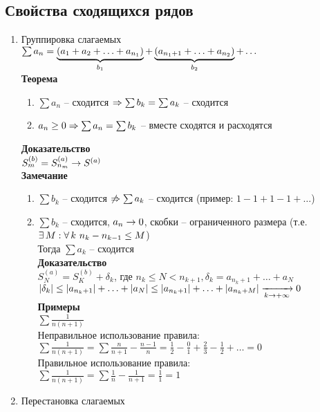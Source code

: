 \documentclass[12pt]{article}
\begin{document}
\subsection{Свойства сходящихся рядов}
\begin{enumerate}
    \item Группировка слагаемых\\
    $\sum a_n = \ub{b_1}{(a_1 + a_2 + \ldots + a_{n_1})} + \ub{b_2}{(a_{n_1+1} + \ldots + a_{n_2})} + \ldots$\\
    \textbf{Теорема}
    \begin{enumerate}
        \item $\sum a_n$ -- сходится $\Rto \sum b_k = \sum a_k$ -- сходится
        \item $a_n \geq 0 \Rto \sum a_n = \sum b_k$ -- вместе сходятся и расходятся
    \end{enumerate}
    \textbf{Доказательство}\\
    $S^{(b)}_m = S^{(a)}_{n_m} \rto S^{(a)}$\\
    \textbf{Замечание}
    \begin{enumerate}
        \item $\sum b_k$ -- сходится $\not\Rto \sum a_k$ -- сходится (пример: $1 - 1 + 1 - 1 + \ldots$)
        \item $\sum b_k$ -- сходится, $a_n \rto 0$, скобки -- ограниченного размера (т.е. $\ex M: \fall k\ n_k - n_{k-1} \leq M$)\\
        Тогда $\sum a_k$ -- сходится\\
        \textbf{Доказательство}\\
        $S_N^{(a)} = S_K^{(b)} + \delta_k$, где $n_k \leq N < n_{k+1}, \delta_k = a_{n_k+1} + \ldots + a_N$\\
        $|\delta_k| \leq |a_{n_k + 1}| + \ldots + |a_N| \leq |a_{n_k + 1}| + \ldots + |a_{n_k + M}| \xrto[k\rto +\infty]{} 0$\\
        \textbf{Примеры}\\
        $\sum \frac1{n(n+1)}$\\
        Неправильное использование правила:\\
        $\sum \frac1{n(n+1)} = \sum \frac n{n+1}-\frac{n-1}n = \frac12 - \frac01 + \frac23 - \frac12 + \ldots = 0$\\
        Правильное использование правила:\\
        $\sum \frac1{n(n+1)} = \sum \frac1{n} - \frac1{n+1} = \frac11 = 1$
    \end{enumerate}
    \item Перестановка слагаемых\\

\end{enumerate}
\end{document}

